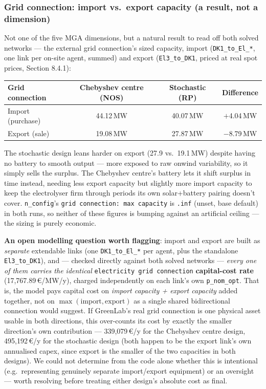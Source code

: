 \documentclass[11pt]{article}
\begin{document}
\subsubsection{Grid connection: import vs.\ export capacity (a result, not a dimension)}
\label{sec:decisive-grid}
Not one of the five MGA dimensions, but a natural result to read off both
solved networks --- the external grid connection's sized capacity,
import (\texttt{DK1\_to\_El\_*}, one link per on-site agent, summed) and
export (\texttt{El3\_to\_DK1}, priced at real spot prices, Section 8.4.1):
\begin{center}
\small
\begin{tabular}{@{}lccc@{}}
\toprule
Grid connection & Chebyshev centre (NOS) & Stochastic (RP) & Difference \\
\midrule
Import (purchase) & 44.12\,MW & 40.07\,MW &  $+$4.04\,MW \\
Export (sale)      & 19.08\,MW & 27.87\,MW &  $-$8.79\,MW \\
\bottomrule
\end{tabular}
\end{center}
The stochastic design leans harder on export (27.9 vs.\ 19.1\,MW) despite
having no battery to smooth output --- more exposed to raw onwind
variability, so it simply sells the surplus. The Chebyshev centre's
battery lets it shift surplus in time instead, needing less export
capacity but slightly more import capacity to keep the electrolyser firm
through periods its own solar+battery pairing doesn't cover.
\texttt{n\_config}'s \texttt{grid connection: max capacity} is
\texttt{.inf} (unset, base default) in both runs, so neither of these
figures is bumping against an artificial ceiling --- the sizing is purely
economic.

\textbf{An open modelling question worth flagging}: import and export are
built as \emph{separate} extendable links (one \texttt{DK1\_to\_El\_*} per
agent, plus the standalone \texttt{El3\_to\_DK1}), and --- checked directly
against both solved networks --- \emph{every one of them carries the
identical} \texttt{electricity grid connection} \textbf{capital-cost rate}
(17,767.89\,€/MW/y), charged independently on each link's own
\texttt{p\_nom\_opt}. That is, the model pays capital cost on
\emph{import capacity + export capacity} added together, not on
$\max(\text{import}, \text{export})$ as a single shared bidirectional
connection would suggest. If GreenLab's real grid connection is one
physical asset usable in both directions, this over-counts its cost by
exactly the smaller direction's own contribution --- 339,079\,€/y for the
Chebyshev centre design, 495,192\,€/y for the stochastic design (both
happen to be the export link's own annualised capex, since export is the
smaller of the two capacities in both designs). We could not determine
from the code alone whether this is intentional (e.g.\ representing
genuinely separate import/export equipment) or an oversight --- worth
resolving before treating either design's absolute cost as final.
\end{document}
